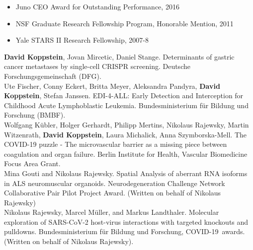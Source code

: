 \documentclass[10pt,a4paper]{article}
\begin{document}
\vspace{0.1in}

\spacedhrule{0.1em}{-0.2em}  %


\begin{itemize}
\item Juno CEO Award for Outstanding Performance, 2016
\item NSF Graduate Research Fellowship Program, Honorable Mention, 2011
\item Yale STARS II Research Fellowship, 2007-8
\end{itemize}

\spacedhrule{0.1em}{-0.2em}  %


{\noindent \textbf{David Koppstein}, Jovan Mircetic, Daniel Stange. Determinants of gastric cancer metastases by single-cell CRISPR screening. Deutsche Forschungsgemeinschaft (DFG).}  \vspace{0.1em} \\

{\noindent Ute Fischer, Conny Eckert, Britta Meyer, Aleksandra Pandyra, \textbf{David Koppstein}, Stefan Janssen. EDI-4-ALL: Early Detection and Interception for Childhood Acute Lymphoblastic Leukemia. Bundesministerium für Bildung und Forschung (BMBF).} \vspace{0.1em} \\

{\noindent Wolfgang Kübler, Holger Gerhardt, Philipp Mertins, Nikolaus Rajewsky, Martin Witzenrath, \textbf{David Koppstein}, Laura Michalick, Anna Szymborska-Mell. The COVID-19 puzzle - The microvascular barrier as a missing piece between coagulation and organ failure. Berlin Institute for Health, Vascular Biomedicine Focus Area Grant.}  \vspace{0.1em} \\

{\noindent Mina Gouti and Nikolaus Rajewsky. Spatial Analysis of aberrant RNA isoforms in ALS neuromuscular organoids. Neurodegeneration Challenge Network Collaborative Pair Pilot Project Award. (Written on behalf of Nikolaus Rajewsky)} \vspace{0.1em} \\

{\noindent Nikolaus Rajewsky, Marcel Müller, and Markus Landthaler. Molecular exploration of SARS-CoV-2 host-virus interactions with targeted knockouts and pulldowns. Bundesministerium für Bildung und Forschung, COVID-19\
 awards. (Written on behalf of Nikolaus Rajewsky)}. \vspace{0.1em} \\
\end{document}
